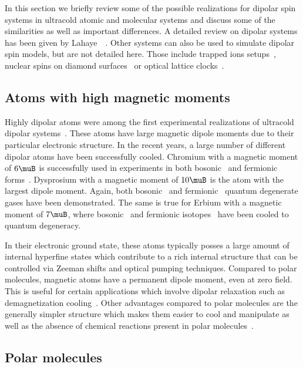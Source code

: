 In this section we briefly review some of the possible realizations for dipolar spin
systems in ultracold atomic and molecular systems and discuss some of the similarities
as well as important differences. A detailed review on dipolar systems has been given by Lahaye~\etal~\cite{Lahaye2009}. Other systems can also be used to simulate dipolar spin models, but are not detailed here. Those include trapped ions setups~\cite{Britton2012,Kim2010}, nuclear spins on diamond surfaces~\cite{Cai2012} or optical lattice clocks~\cite{Martin2013}.

\subsection{Atoms with high magnetic moments}

Highly dipolar atoms were among the first experimental realizations of ultracold dipolar
systems~\cite{Griesmaier2005a}. These atoms have large magnetic dipole moments due to their
particular electronic structure. In the recent years, a large number of different dipolar atoms
have been successfully cooled. Chromium with a magnetic moment of $6\muB$ is successfully
used in experiments in both bosonic~\cite{Griesmaier2005a,Beaufils2008} and fermionic
forms~\cite{Naylor2015}. Dysprosium with a magnetic moment of $10\muB$ is the atom with the largest
dipole moment. Again, both bosonic~\cite{Lu2011} and fermionic~\cite{Lu2012} quantum degenerate
gases have been demonstrated. The same is true for Erbium with a magnetic moment of $7\muB$, where
bosonic~\cite{Aikawa2012} and fermionic isotopes~\cite{Aikawa2014} have been cooled to quantum
degeneracy.

In their electronic ground state, these atoms typically posses a large amount of internal hyperfine
states which contribute to a rich internal structure that can be controlled via Zeeman shifts
and optical pumping techniques. Compared to polar molecules, magnetic atoms have a permanent
dipole moment, even at zero field. This is useful for certain applications which involve dipolar
relaxation such as demagnetization cooling~\cite{Hensler2003,Fattori2006,Volchkov2013}. Other
advantages compared to polar molecules are the generally simpler structure which makes them easier
to cool and manipulate as well as the absence of chemical reactions present in polar
molecules~\cite{Ospelkaus2010a,Quemener2012}.

\subsection{Polar molecules}

